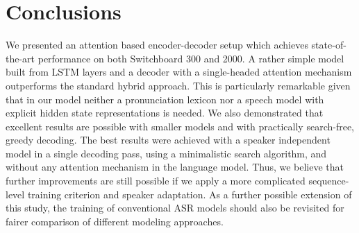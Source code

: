 \documentclass[a4paper]{article}
\begin{document}
\section{Conclusions}
\vspace{-1.0mm}
We presented an attention based encoder-decoder setup which achieves state-of-the-art performance on both Switchboard 300 and 2000.
A rather simple model built from LSTM layers and a decoder with a single-headed attention mechanism outperforms the standard hybrid approach.
This is particularly remarkable given that in our model neither a pronunciation lexicon nor a speech model with explicit hidden state representations is needed.
We also demonstrated that excellent results are possible with smaller models and with practically search-free, greedy decoding.
The best results were achieved with a speaker independent model in a single decoding pass, using a minimalistic search algorithm, and without any attention mechanism in the language model.
Thus, we believe that further improvements are still possible if we apply a more complicated sequence-level training criterion and speaker adaptation.
As a further possible extension of this study, the training of conventional ASR models should also be revisited for fairer comparison of different modeling approaches.


\ninept


\end{document}
